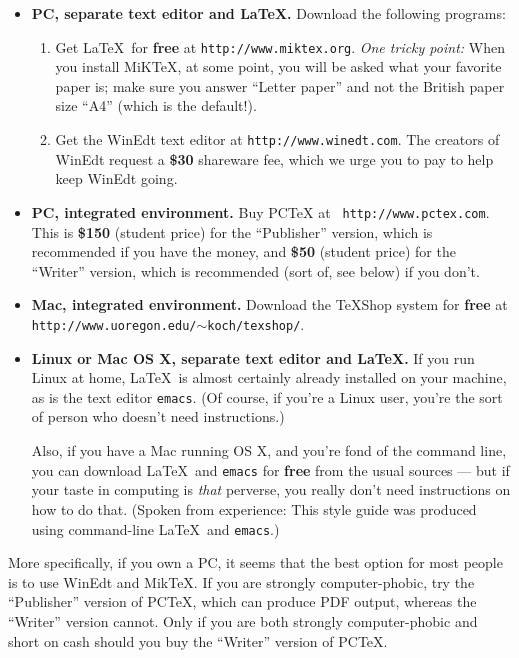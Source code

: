 \documentclass[modernstyle,12pt]{sjsuthesis}
\theoremstyle{definition}
\begin{document}
\begin{itemize}
\item {\bf PC, separate text editor and \LaTeX.}  Download the
  following programs:
  \begin{enumerate}
  \item Get \LaTeX\ for {\bf free\/} at {\tt http://www.miktex.org}.
    {\it One tricky point:\/} When you install MiKTeX, at some point,
    you will be asked what your favorite paper is; make sure you
    answer ``Letter paper'' and not the British paper size ``A4''
    (which is the default!).
  \item Get the WinEdt text editor at {\tt http://www.winedt.com}.
    The creators of WinEdt request a {\bf \$30\/} shareware fee, which
    we urge you to pay to help keep WinEdt going.
  \end{enumerate}

\item {\bf PC, integrated environment.}  Buy PCTeX at {\tt
    http://www.pctex.com}.  This is {\bf \$150\/} (student price) for
  the ``Publisher'' version, which is recommended if you have the
  money, and {\bf \$50\/} (student price) for the ``Writer'' version,
  which is recommended (sort of, see below) if you don't.

\item {\bf Mac, integrated environment.} Download the TeXShop system
  for {\bf free\/} at {\tt
    http://www.uoregon.edu/$\sim$koch/texshop/}.

\item {\bf Linux or Mac OS X, separate text editor and \LaTeX.}  If
  you run Linux at home, \LaTeX\ is almost certainly already installed
  on your machine, as is the text editor {\tt emacs}.  (Of course, if
  you're a Linux user, you're the sort of person who doesn't need
  instructions.)

  Also, if you have a Mac running OS X, and you're fond of the command
  line, you can download \LaTeX\ and {\tt emacs\/} for {\bf free\/}
  from the usual sources --- but if your taste in computing is {\it
    that\/} perverse, you really don't need instructions on how to do
  that.  (Spoken from experience: This style guide was produced using
  command-line \LaTeX\ and {\tt emacs}.)
\end{itemize}

More specifically, if you own a PC, it seems that the best option for
most people is to use WinEdt and MikTeX.  If you are strongly
computer-phobic, try the ``Publisher'' version of PCTeX, which can
produce PDF output, whereas the ``Writer'' version cannot.  Only if
you are both strongly computer-phobic and short on cash should you buy
the ``Writer'' version of PCTeX.
\end{document}
